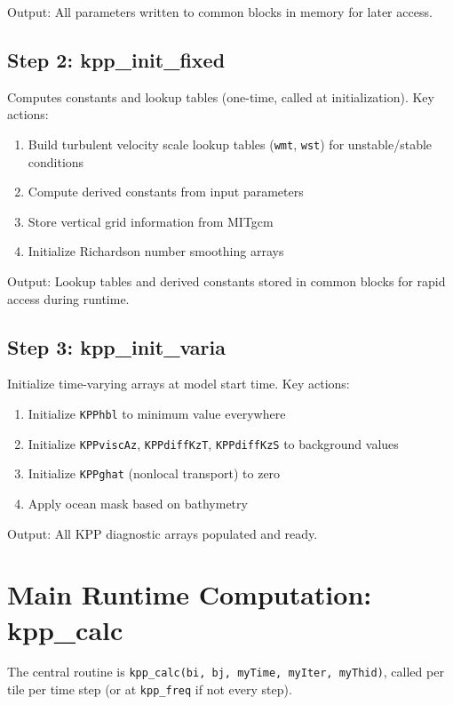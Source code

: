 \documentclass[11pt, a4paper]{article}
\begin{document}
Output: All parameters written to common blocks in memory for later access.

\subsection{Step 2: kpp\_init\_fixed}

Computes constants and lookup tables (one-time, called at initialization). Key actions:

\begin{enumerate}
    \item Build turbulent velocity scale lookup tables (\texttt{wmt}, \texttt{wst}) for unstable/stable conditions
    \item Compute derived constants from input parameters
    \item Store vertical grid information from MITgcm
    \item Initialize Richardson number smoothing arrays
\end{enumerate}

Output: Lookup tables and derived constants stored in common blocks for rapid access during runtime.

\subsection{Step 3: kpp\_init\_varia}

Initialize time-varying arrays at model start time. Key actions:

\begin{enumerate}
    \item Initialize \texttt{KPPhbl} to minimum value everywhere
    \item Initialize \texttt{KPPviscAz}, \texttt{KPPdiffKzT}, \texttt{KPPdiffKzS} to background values
    \item Initialize \texttt{KPPghat} (nonlocal transport) to zero
    \item Apply ocean mask based on bathymetry
\end{enumerate}

Output: All KPP diagnostic arrays populated and ready.

\section{Main Runtime Computation: kpp\_calc}

The central routine is \texttt{kpp\_calc(bi, bj, myTime, myIter, myThid)}, called per tile per time step (or at \texttt{kpp\_freq} if not every step).
\end{document}
